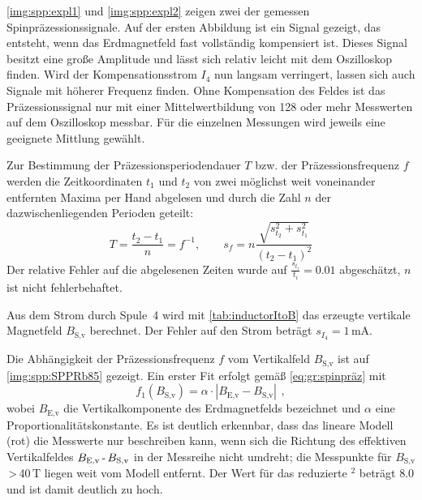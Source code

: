 \autoref{img:spp:expl1} und \autoref{img:spp:expl2} zeigen zwei der gemessen Spinpräzessionssignale.
Auf der ersten Abbildung ist ein Signal gezeigt, das entsteht, wenn das Erdmagnetfeld fast
vollständig kompensiert ist. Dieses Signal besitzt eine große Amplitude und lässt sich relativ leicht
mit dem Oszilloskop finden.
Wird der Kompensationsstrom $I_4$ nun langsam verringert, lassen sich auch Signale mit höherer Frequenz finden.
Ohne Kompensation des Feldes ist das Präzessionssignal
nur mit einer Mittelwertbildung von 128 oder mehr Messwerten
auf dem Oszilloskop messbar. Für die einzelnen Messungen wird jeweils eine geeignete Mittlung gewählt.

Zur Bestimmung der Präzessionsperiodendauer $T$ bzw. der
Präzessionsfrequenz $f$ werden die Zeitkoordinaten $t_1$ und $t_2$
von zwei möglichst weit voneinander entfernten Maxima per Hand abgelesen und durch
die Zahl $n$ der dazwischenliegenden Perioden geteilt:
\begin{equation}
    T=\frac{t_2-t_1}{n}=f^{-1}, \qquad s_f = n \frac{\sqrt{s_{t_2}^2 + s_{t_1}^2}}{ \left( t_2 -t_1 \right)^2 }
\end{equation}
Der relative Fehler auf die abgelesenen Zeiten wurde auf $\frac{s_{t_i}}{t_i}=0.01$ abgeschätzt,
$n$ ist nicht fehlerbehaftet.

Aus dem Strom durch Spule~4 wird mit \autoref{tab:inductorItoB} das erzeugte vertikale Magnetfeld
$B_\text{S,v}$ berechnet. Der Fehler auf den Strom beträgt $s_{I_4}=1$\,mA.

Die Abhängigkeit der Präzessionsfrequenz $f$ vom Vertikalfeld $B_\text{S,v}$ ist auf
\autoref{img:spp:SPPRb85} gezeigt.
Ein erster Fit erfolgt gemäß \autoref{eq:gr:spinpräz} mit
\begin{equation}
    f_1(B_\text{S,v})=\alpha \cdot |B_\text{E,v}-B_\text{S,v}| \ \, ,
\end{equation}
wobei $B_\text{E,v}$ die Vertikalkomponente des Erdmagnetfelds bezeichnet und
$\alpha$ eine Proportionalitätskonstante.
Es ist deutlich erkennbar, dass das lineare Modell (rot) die Messwerte nur beschreiben kann,
wenn sich die Richtung des effektiven Vertikalfeldes
$B_\text{E,v} \text{\,-\,} B_\text{S,v}$ in der Messreihe nicht umdreht;
die Messpunkte für $B_\text{S,v}$\,>\,40\,\textmu T liegen weit vom Modell entfernt.
Der Wert für das reduzierte \textchi$^2$ beträgt 8.0 und ist damit deutlich zu hoch.

